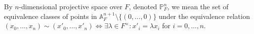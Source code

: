 By $n$-dimensional projective space over $F$, denoted $\mathbb{P}_F^n$, we mean the set of equivalence classes of points in $\mathbb{A}_F^{n+1} \setminus \{(0,\ldots,0)\}$ under the equivalence relation $(x_0,\ldots,x_n) \sim (x'_0,\ldots,x'_n) \Leftrightarrow \exists \lambda \in F^\times: x'_i = \lambda x_i$ for $i=0,\ldots,n$.